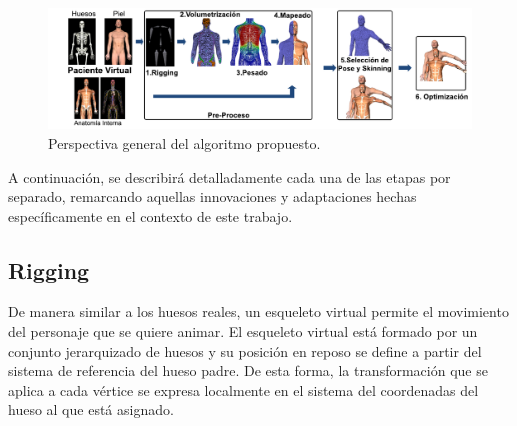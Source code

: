 \begin{figure}[!th]
   \centering
    \includegraphics[width=\textwidth]{IMG/resumen.pdf}%
    \caption{Perspectiva general del algoritmo propuesto.}
		\label{fig:Resumen}
\end{figure}


%

A continuación, se describirá detalladamente cada una de las etapas por separado, remarcando aquellas innovaciones y adaptaciones hechas específicamente en el contexto de este trabajo.



\subsection{Rigging}
\label{posing:rigging}
De manera similar a los huesos reales, un esqueleto virtual permite el movimiento del personaje que se quiere animar. El esqueleto virtual está formado por un conjunto jerarquizado de huesos y su posición en reposo se define a partir del sistema de referencia del hueso padre. De esta forma, la transformación que se aplica a cada vértice se expresa localmente en el sistema del coordenadas del hueso al que está asignado.  %



